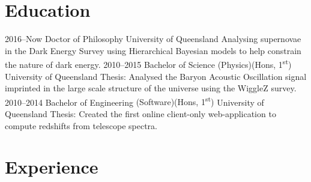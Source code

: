 \documentclass[]{friggeri-cv} %
\begin{document}





\section{Education}

\begin{entrylist}
\entry
{2016--Now}
{Doctor of Philosophy}
{University of Queensland}
{Analysing supernovae in the Dark Energy Survey using Hierarchical Bayesian models to help constrain the nature of dark energy.}
\entry
{2010--2015}
{Bachelor of Science {\normalfont (Physics)(Hons, 1\textsuperscript{st})}}
{University of Queensland}
{Thesis: Analysed the Baryon Acoustic Oscillation signal imprinted in the large scale structure of the universe using the WiggleZ survey.}
\entry
{2010--2014}
{Bachelor of Engineering {\normalfont (Software)(Hons, 1\textsuperscript{st})}}
{University of Queensland}
{Thesis: Created the first online client-only web-application to compute redshifts from telescope spectra.}

\end{entrylist}

\section{Experience}
\end{document}
